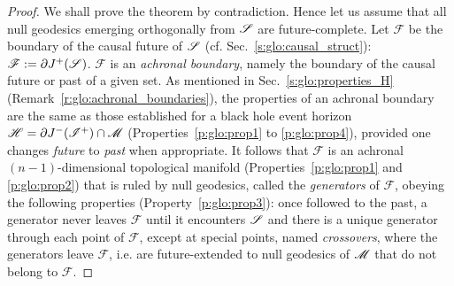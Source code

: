 \begin{proof}
We shall prove the theorem by contradiction. Hence let us assume that all
null geodesics emerging orthogonally from $\mathscr{S}$ are future-complete. Let $\mathscr{F}$
be the boundary of the causal future of $\mathscr{S}$
(cf. Sec.~\ref{s:glo:causal_struct}): $\mathscr{F} := \partial J^+(\mathscr{S})$.
$\mathscr{F}$ is an \emph{achronal boundary},
namely the boundary of the causal future or past of a given set.
As mentioned in Sec.~\ref{s:glo:properties_H} (Remark~\ref{r:glo:achronal_boundaries}),
the properties of an achronal boundary are the same as those established for a black hole event horizon
$\mathscr{H} = \partial J^-(\mathscr{I}^+) \cap \mathscr{M}$ (Properties~\ref{p:glo:prop1} to \ref{p:glo:prop4}),
provided one changes \emph{future} to \emph{past} when appropriate.
It follows that $\mathscr{F}$ is an achronal $(n-1)$-dimensional topological manifold
(Properties~\ref{p:glo:prop1} and \ref{p:glo:prop2}) that is ruled by null geodesics,
called the \emph{generators} of $\mathscr{F}$,
obeying the following properties (Property~\ref{p:glo:prop3}):
once followed to the past, a generator never leaves $\mathscr{F}$ until it encounters $\mathscr{S}$
and there is a unique generator through each point of $\mathscr{F}$, except at special
points, named \emph{crossovers}, where the generators leave
$\mathscr{F}$, i.e. are future-extended to null geodesics of $\mathscr{M}$ that do not belong
to $\mathscr{F}$.


\end{proof}
